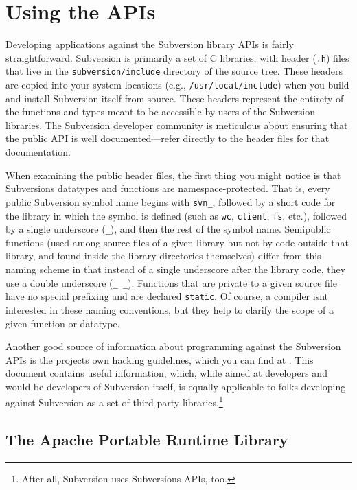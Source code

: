 \section{Using the APIs}\label{svn.developer.usingapi}

Developing applications against the Subversion library APIs is fairly
straightforward. Subversion is primarily a set of C libraries, with
header (\texttt{.h}) files that live in the \texttt{subversion/include}
directory of the source tree. These headers are copied into your system
locations (e.g., \texttt{/usr/local/include}) when you build and install
Subversion itself from source. These headers represent the entirety of
the functions and types meant to be accessible by users of the
Subversion libraries. The Subversion developer community is meticulous
about ensuring that the public API is well documented---refer directly
to the header files for that documentation.

When examining the public header files, the first thing you might notice
is that Subversion\textquotesingle s datatypes and functions are
namespace-protected. That is, every public Subversion symbol name begins
with \texttt{svn\_}, followed by a short code for the library in which
the symbol is defined (such as \texttt{wc}, \texttt{client},
\texttt{fs}, etc.), followed by a single underscore (\texttt{\_}), and
then the rest of the symbol name. Semipublic functions (used among
source files of a given library but not by code outside that library,
and found inside the library directories themselves) differ from this
naming scheme in that instead of a single underscore after the library
code, they use a double underscore (\texttt{\_\ \_}). Functions that are
private to a given source file have no special prefixing and are
declared \texttt{static}. Of course, a compiler isn\textquotesingle t
interested in these naming conventions, but they help to clarify the
scope of a given function or datatype.

Another good source of information about programming against the
Subversion APIs is the project\textquotesingle s own hacking guidelines,
which you can find at
\href{https://subversion.apache.org/docs/community-guide/}{}. This
document contains useful information, which, while aimed at developers
and would-be developers of Subversion itself, is equally applicable to
folks developing against Subversion as a set of third-party
libraries.\footnote{After all, Subversion uses
  Subversion\textquotesingle s APIs, too.}

\subsection{The Apache Portable Runtime
Library}\label{svn.developer.usingapi.apr}

